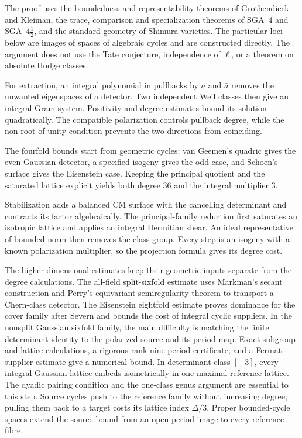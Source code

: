 \documentclass[11pt]{article}
\theoremstyle{definition}
\theoremstyle{remark}
\begin{document}
The proof uses the boundedness and representability theorems of Grothendieck and Kleiman, the trace, comparison and specialization theorems of SGA~4 and SGA~$4\frac12$, and the standard geometry of Shimura varieties. The particular loci below are images of spaces of algebraic cycles and are constructed directly. The argument does not use the Tate conjecture, independence of $\ell$, or a theorem on absolute Hodge classes.


For extraction, an integral polynomial in pullbacks by $a$ and $\bar a$
removes the unwanted eigenspaces of a detector. Two independent Weil
classes then give an integral Gram system. Positivity and degree
estimates bound its solution quadratically. The compatible polarization
controls pullback degree, while the non-root-of-unity condition prevents
the two directions from coinciding.

The fourfold bounds start from geometric cycles: van Geemen's quadric
gives the even Gaussian detector, a specified isogeny gives the odd
case, and Schoen's surface gives the Eisenstein case. Keeping the
principal quotient and the saturated lattice explicit yields both
degree $36$ and the integral multiplier $3$.

Stabilization adds a balanced CM surface with the cancelling determinant
and contracts its factor algebraically. The principal-family reduction
first saturates an isotropic lattice and applies an integral Hermitian
shear. An ideal representative of bounded norm then removes the class
group. Every step is an isogeny with a known polarization multiplier,
so the projection formula gives its degree cost.


The higher-dimensional estimates keep their geometric inputs separate
from the degree calculations. The all-field split-sixfold estimate uses
Markman's secant construction and Perry's equivariant semiregularity
theorem to transport a Chern-class detector. The Eisenstein eightfold
estimate proves dominance for the cover family after Severn and bounds the cost of
integral cyclic suppliers. In the nonsplit Gaussian sixfold family,
the main difficulty is matching the finite determinant identity to
the polarized source and its period map. Exact subgroup and lattice
calculations, a rigorous rank-nine period certificate, and a Fermat
supplier estimate give a numerical bound.  In determinant class
$[-3]$, every integral Gaussian lattice embeds isometrically in one
maximal reference lattice.  The dyadic pairing condition and the
one-class genus argument are essential to this step.  Source cycles
push to the reference family without increasing degree; pulling them
back to a target costs its lattice index $\Delta/3$.
Proper bounded-cycle spaces extend the source bound from an open
period image to every reference fibre.
\end{document}
